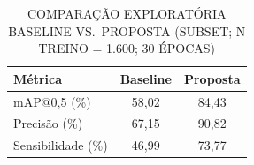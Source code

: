 \begin{table}[H]
    \centering
    \footnotesize
    \caption{COMPARAÇÃO EXPLORATÓRIA BASELINE VS.\ PROPOSTA (SUBSET; N TREINO = 1.600; 30 ÉPOCAS)}
    \label{tab:comparacao_subset}
    \begin{tabular}{lcc}
        \toprule
        \textbf{Métrica} & \textbf{Baseline} & \textbf{Proposta} \\
        \midrule
        mAP@0,5 (\%) & 58,02 & 84,43 \\
        Precisão (\%) & 67,15 & 90,82 \\
        Sensibilidade (\%) & 46,99 & 73,77 \\
        \bottomrule
    \end{tabular}
\end{table}
